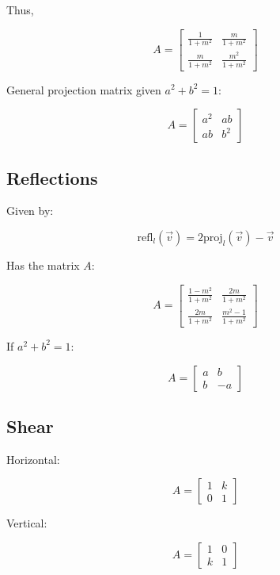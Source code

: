 Thus,

\[A=
    \begin{bmatrix}\frac{1}{1+m^2}&\frac{m}{1+m^2}\\\frac{m}{1+m^2}&\frac{m^2}{1+m^2}\end{bmatrix}
\]

General projection matrix given $a^2+b^2=1$:

\[\boxed{
    A= \begin{bmatrix}a^2&ab\\ ab&b^2\end{bmatrix}
}\]

\subsection{Reflections}

Given by:

\[\mathrm{refl}_l(\vec{v})=2\mathrm{proj}_l(\vec{v})-\vec{v}\]

Has the matrix $A$:

\[A= \begin{bmatrix}\frac{1-m^2}{1+m^2}&\frac{2m}{1+m^2}\\\frac{2m}{1+m^2}&\frac{m^2-1}{1+m^2}\end{bmatrix}\]

If $a^2+b^2=1$:

\[\boxed{
    A= \begin{bmatrix}a&b\\ b&-a\end{bmatrix}
}\]

\subsection{Shear}

Horizontal:

\[A= \begin{bmatrix}1&k\\ 0&1\end{bmatrix}\]

Vertical:

\[A= \begin{bmatrix}1&0\\ k&1\end{bmatrix}\]
